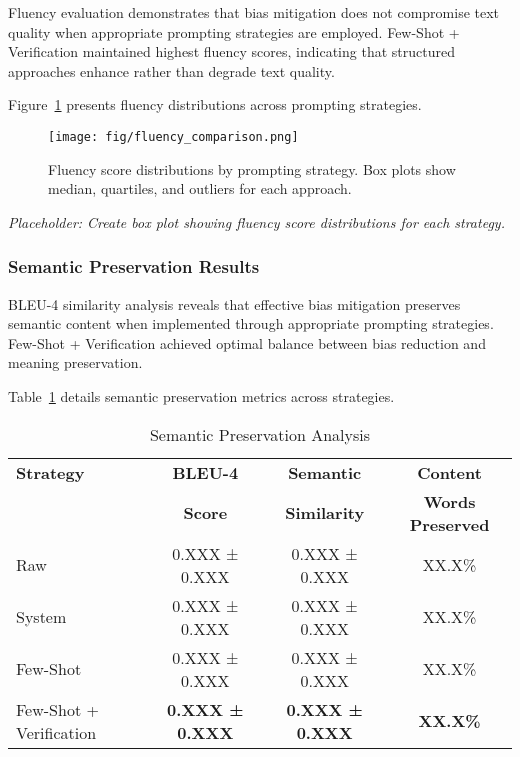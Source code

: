 Fluency evaluation demonstrates that bias mitigation does not compromise text quality when appropriate prompting strategies are employed. Few-Shot + Verification maintained highest fluency scores, indicating that structured approaches enhance rather than degrade text quality.

Figure~\ref{fig:fluency_comparison} presents fluency distributions across prompting strategies.

\begin{figure}[htbp]
\centerline{\texttt{[image: fig/fluency\_comparison.png]}}
\caption{Fluency score distributions by prompting strategy. Box plots show median, quartiles, and outliers for each approach.}
\label{fig:fluency_comparison}
\end{figure}

\textit{Placeholder: Create box plot showing fluency score distributions for each strategy.}

\subsubsection{Semantic Preservation Results}

BLEU-4 similarity analysis reveals that effective bias mitigation preserves semantic content when implemented through appropriate prompting strategies. Few-Shot + Verification achieved optimal balance between bias reduction and meaning preservation.

Table~\ref{tab:semantic_analysis} details semantic preservation metrics across strategies.

\begin{table}[htbp]
\caption{Semantic Preservation Analysis}
\begin{center}
\begin{tabular}{|l|c|c|c|}
\hline
\textbf{Strategy} & \textbf{BLEU-4} & \textbf{Semantic} & \textbf{Content} \\
                  & \textbf{Score} & \textbf{Similarity} & \textbf{Words Preserved} \\
\hline
Raw & 0.XXX ± 0.XXX & 0.XXX ± 0.XXX & XX.X\% \\
\hline
System & 0.XXX ± 0.XXX & 0.XXX ± 0.XXX & XX.X\% \\
\hline
Few-Shot & 0.XXX ± 0.XXX & 0.XXX ± 0.XXX & XX.X\% \\
\hline
Few-Shot + Verification & \textbf{0.XXX ± 0.XXX} & \textbf{0.XXX ± 0.XXX} & \textbf{XX.X\%} \\
\hline
\end{tabular}
\label{tab:semantic_analysis}
\end{center}
\end{table}

